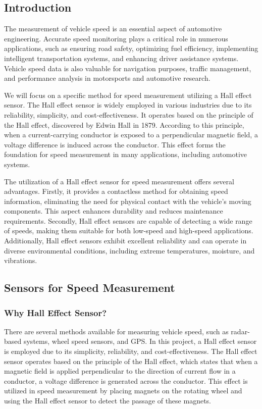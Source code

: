 \documentclass[
12pt,
oneside, 
onehalfspacing, 
nolistspacing, 
parskip, 
chapterinoneline, 
]{AASTCOMPUTER}
\begin{document}
\subsection{Introduction}
The measurement of vehicle speed is an essential aspect of automotive engineering. Accurate speed monitoring plays a critical role in numerous applications, such as ensuring road safety, optimizing fuel efficiency, implementing intelligent transportation systems, and enhancing driver assistance systems. Vehicle speed data is also valuable for navigation purposes, traffic management, and performance analysis in motorsports and automotive research.

We will focus on a specific method for speed measurement utilizing a Hall effect sensor. The Hall effect sensor is widely employed in various industries due to its reliability, simplicity, and cost-effectiveness. It operates based on the principle of the Hall effect, discovered by Edwin Hall in 1879. According to this principle, when a current-carrying conductor is exposed to a perpendicular magnetic field, a voltage difference is induced across the conductor. This effect forms the foundation for speed measurement in many applications, including automotive systems.

The utilization of a Hall effect sensor for speed measurement offers several advantages. Firstly, it provides a contactless method for obtaining speed information, eliminating the need for physical contact with the vehicle's moving components. This aspect enhances durability and reduces maintenance requirements. Secondly, Hall effect sensors are capable of detecting a wide range of speeds, making them suitable for both low-speed and high-speed applications. Additionally, Hall effect sensors exhibit excellent reliability and can operate in diverse environmental conditions, including extreme temperatures, moisture, and vibrations.

\subsection{Sensors for Speed Measurement}
\subsubsection{Why Hall Effect Sensor?}
There are several methods available for measuring vehicle speed, such as radar-based systems, wheel speed sensors, and GPS. In this project, a Hall effect sensor is employed due to its simplicity, reliability, and cost-effectiveness. The Hall effect sensor operates based on the principle of the Hall effect, which states that when a magnetic field is applied perpendicular to the direction of current flow in a conductor, a voltage difference is generated across the conductor. This effect is utilized in speed measurement by placing magnets on the rotating wheel and using the Hall effect sensor to detect the passage of these magnets.
\end{document}
